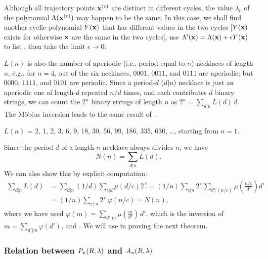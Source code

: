 \documentclass[preprint]{revtex4-1}
\begin{document}
\begin{remark}[1]
Although all trajectory points $\mathbf{x}^{(c)}$ are distinct in
  different cycles,
the value $\lambda_c$ of the polynomial $\Lambda(\mathbf{x}^{(c)})$
  may happen to be the same.
In this case,
  we shall find another cyclic polynomial $Y(\mathbf{x})$ that
  has different values in the two cycles
  [$Y(\mathbf{x})$ exists for otherwise $\mathbf{x}$ are the same in the two cycles],
  use $\Lambda'(\mathbf{x}) = \Lambda(\mathbf{x}) + \epsilon Y(\mathbf{x})$
  to list ,
  then take the limit
  $\epsilon \rightarrow 0$.
\end{remark}


\begin{remark}[2]
$L(n)$ is also the number of aperiodic (i.e., period equal to $n$)
  necklaces of length $n$,
  e.g., for $n = 4$,
  out of the six necklaces, $0001$, $0011$, and $0111$ are aperiodic;
  but $0000$, $1111$, and $0101$ are periodic.
%
Since a period-$d$ ($d|n$) necklace is just an aperiodic one
  of length-$d$ repeated $n/d$ times,
and each contributes $d$ binary strings,
we can count the $2^n$ binary strings of length $n$ as
  $2^n = \sum_{d|n} L(d) \, d$.
The M\"obius inversion leads to the same result of .
\end{remark}


$L(n)$ =
2, 1, 2, 3, 6, 9, 18, 30, 56, 99, 186, 335, 630, \ldots,
starting from $n = 1$.



Since the period $d$ of a length-$n$ necklace always divides $n$,
we have
\begin{equation}
N(n) = \sum_{d|n} L(d).
\label{eq:necklacelyndon}
\end{equation}
%
We can also show this by explicit computation:
\begin{align*}
\sum_{d | n} L(d)
  &= \sum_{d | n} (1/d) \sum_{c |  d} \mu(d/c) 2^{\,c}
   = (1/n) \sum_{c | n} 2^{\,c} \sum_{d'  |  (n/c)}
        \mu\left(\frac{n/c}{d'}\right) d' \\
  &= (1/n) \sum_{c \, | \, n} 2^{\,c} \, \varphi(n/c)
  = N(n),
\end{align*}
where we have used $\varphi(m) = \sum_{d' | m} \mu(\frac{m}{d'}) \, d'$,
which is the inversion of $m = \sum_{d' | m} \varphi(d')$,
and .
%
We will use  in proving the next theorem.



\subsubsection{Relation between $P_n(R, \lambda)$ and $A_n(R, \lambda)$}
\end{document}

